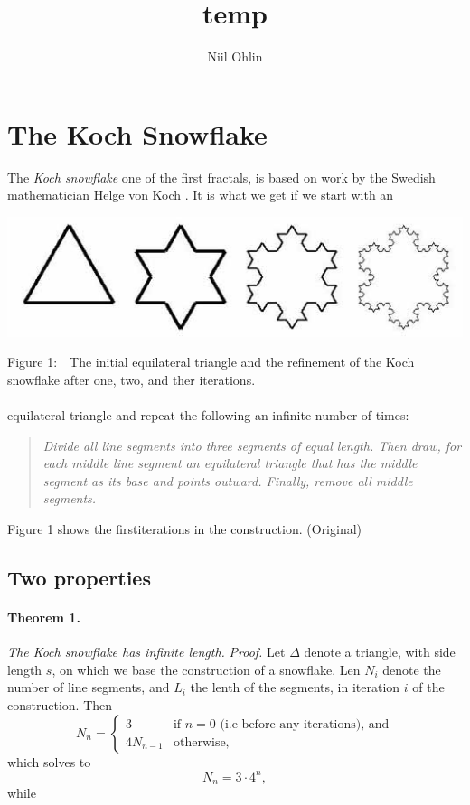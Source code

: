 \documentclass[a4paper]{article}
\begin{document}
\title{temp}
\author{Niil Ohlin}
\date{}
\maketitle

\section{The Koch Snowflake}
The \emph{Koch snowflake} one of the first fractals, is based on work by the
Swedish mathematician Helge von Koch \cite{aoeu}. It is what we get if we
start with an 
\begin{center}
	\includegraphics[scale=0.4]{snowflake.jpg}
\end{center}
Figure 1:$\quad$The initial equilateral triangle and the refinement of the Koch
snowflake after one, two, and ther iterations.\\
\\
equilateral triangle and repeat the following an infinite number of times:

\begin{quote}
\emph{Divide all line segments into three segments of equal length. Then draw,
	for each middle line segment an equilateral triangle that has the middle
	segment as its base and points outward. Finally, remove all middle segments.
	}
\end{quote}
Figure 1 shows the firstiterations in the construction. \hfill (Original)
\subsection{Two properties}
\paragraph{Theorem 1.} \emph{The Koch snowflake has infinite length.}
\emph{Proof.} Let $\Delta$ denote a triangle, with side length $s$, on which
we base the construction of a snowflake. Len $N_i$ denote the number of line
segments, and $L_i$ the lenth of the segments, in iteration $i$ of the 
construction. Then
$$
	N_n = 
	\begin{cases}
		3 &\text{if } n = 0 \text{ (i.e before any iterations), and} \\
		4N_{n-1} &\text{otherwise,}
	\end{cases}
$$
which solves to
\begin{equation}
	N_n = 3 \cdot 4^n,
\end{equation}
while
\newcommand{\uberfrac}[1]{
	= \frac {L_{n - #1}} {3^#1}
}
\end{document}
